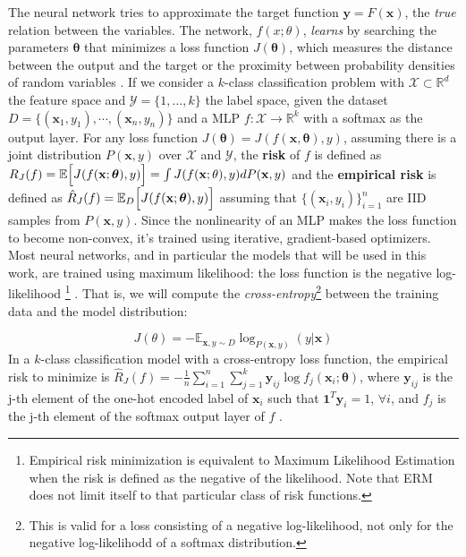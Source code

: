The neural network tries to approximate the target function $\mathbf{y} = F(\mathbf{x})$, the \textit{true} relation between the variables. The network, $f(x;\theta)$, \textit{learns} by searching the parameters $\boldsymbol{\theta}$ that minimizes a loss function $J(\boldsymbol{\theta})$, which measures the distance between the output and the target or the proximity between probability densities of random variables \cite*{calin2020}. If we consider a $k$-class classification problem with $\mathcal{X} \subset \mathbb{R}^d$ the feature space and $\mathcal{Y} = \{1,\dots, k\}$ the label space, given the dataset $D = \{(\mathbf{x}_1, y_1),\cdots,(\mathbf{x}_n, y_n)\}$ and a MLP $f\colon \mathcal{X} \to \mathbb{R}^k$ with a softmax as the output layer.
For any loss function $J(\boldsymbol{\theta}) = J(f(\mathbf{x}, \boldsymbol{\theta}), y)$, assuming there is a joint distribution $P(\mathbf{x},y)$ over $\mathcal{X}$ and $\mathcal{Y}$, the \textbf{risk} of $f$ is defined as $R_J (f) = \mathbb{E}\Bigl[ J(f(\mathbf{x}; \boldsymbol{\theta}), y) \Bigr] = \int J(f(\mathbf{x}; \theta), y) dP(\mathbf{x}, y)$ and the \textbf{empirical risk} is defined as $\hat{R}_J (f) = \mathbb{E}_D \Bigl[ J(f(\mathbf{x}; \boldsymbol{\theta}), y) \Bigr]$ assuming that $\{(\mathbf{x}_i, y_i)\}_{i=1}^n$ are IID samples from $P(\mathbf{x}, y)$.
Since the nonlinearity of an MLP makes the loss function to become non-convex, it's trained using iterative, gradient-based optimizers. Most neural networks, and in particular the models that will be used in this work, are trained using maximum likelihood: the loss function is the negative log-likelihood \footnote{Empirical risk minimization is equivalent to Maximum Likelihood Estimation when the risk is defined as the negative of the likelihood. Note that ERM does not limit itself to that particular class of risk functions.} \cite{goodfellow2016}. That is, we will compute the \textit{cross-entropy}\footnote{This is valid for a loss consisting of a negative log-likelihood, not only for the negative log-likelihodd of a softmax distribution.} between the training data and the model distribution:

\begin{equation}
    J(\theta) = -\mathbb{E}_{\mathbf{x}, y \sim D} \log_{P(\mathbf{x}, y)} (y | \mathbf{x})
\end{equation}
In a $k$-class classification model with a cross-entropy loss function, the empirical risk to minimize is $\hat{R}_J (f) = -\frac{1}{n}\sum_{i=1}^n \sum_{j=1}^k \mathbf{y}_{ij} \log f_j (\mathbf{x}_i; \boldsymbol{\theta})$, where $\mathbf{y}_{ij}$ is the j-th element of the one-hot encoded label of $\mathbf{x}_i$ such that $\mathbf{1}^T \mathbf{y}_i = 1$, $\forall i$, and $f_j$ is the j-th element of the softmax output layer of $f$ \cite{zhang2018}.\\

